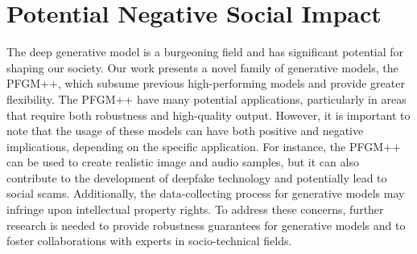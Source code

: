 \section{Potential Negative Social Impact}
\label{app:impact}

The deep generative model is a burgeoning field and has significant potential for shaping our society. Our work presents a novel family of generative models, the PFGM++, which subsume previous high-performing models and provide greater flexibility. The PFGM++ have many potential applications, particularly in areas that require both robustness and high-quality output. However, it is important to note that the usage of these models can have both positive and negative implications, depending on the specific application. For instance, the PFGM++ can be used to create realistic image and audio samples, but it can also contribute to the development of deepfake technology and potentially lead to social scams. Additionally, the data-collecting process for generative models may infringe upon intellectual property rights. To address these concerns, further research is needed to provide robustness guarantees for generative models and to foster collaborations with experts in socio-technical fields.
